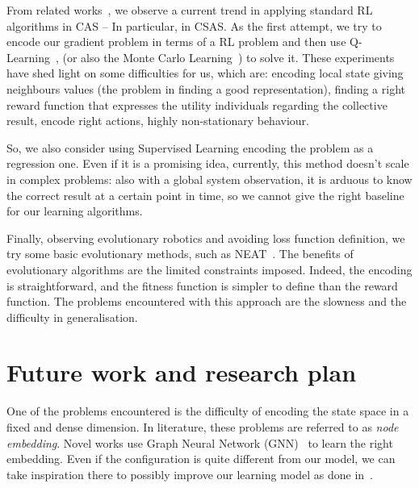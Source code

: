 \documentclass[conference]{IEEEtran}
\begin{document}
From related works~\cite{DAngelo2019}, we observe a current trend in applying standard RL algorithms in CAS -- In particular, in CSAS.
%
%
As the first attempt, we try to encode our gradient problem in terms of a RL problem and then use Q-Learning~\cite{DBLP:journals/ras/Krose95}, (or also the Monte Carlo Learning~\cite{DBLP:conf/nips/Thrun99}) to solve it.
%
These experiments have shed light on some difficulties for us, which are: encoding local state giving neighbours values (the problem in finding a good representation), finding a right reward function that expresses the utility individuals
regarding the collective result, encode right actions, highly non-stationary behaviour. 
%

So, we also consider using Supervised Learning encoding the problem as a regression one.
% 
Even if it is a promising idea, currently, this method doesn't scale in complex problems: also with a global system observation, it is arduous to know the correct result at a certain point in time, so 
we cannot give the right baseline for our learning algorithms.

Finally, observing evolutionary robotics and avoiding loss function definition, we try some basic evolutionary methods, such as NEAT~\cite{DBLP:journals/ec/StanleyM02}.
%
The benefits of evolutionary algorithms are the limited constraints imposed. Indeed, the encoding is straightforward, and the fitness function is simpler to define than the reward function.
%
The problems encountered with this approach are the slowness and the difficulty in generalisation.
%
\section{Future work and research plan}
One of the problems encountered is the difficulty of encoding the state space in a fixed and dense dimension. 
%
%
In literature, these problems are referred to as \emph{node embedding}. 
%
%
Novel works use Graph Neural Network (GNN)~\cite{DBLP:journals/tnn/ScarselliGTHM09} to learn the right embedding.
%
Even if the configuration is quite different from our model, we can take inspiration there to possibly improve our learning model as done in~\cite{DBLP:conf/nips/SukhbaatarSF16}.
\end{document}
